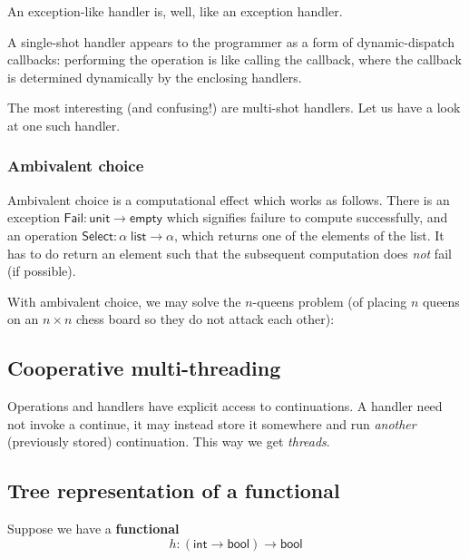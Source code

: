 \documentclass{article}
\begin{document}
An exception-like handler is, well, like an exception handler.

A single-shot handler appears to the programmer as a form of
dynamic-dispatch callbacks: performing the operation is like calling the
callback, where the callback is determined dynamically by the enclosing
handlers.

The most interesting (and confusing!) are multi-shot handlers. Let us
have a look at one such handler.

\hypertarget{ambivalent-choice}{%
\subsubsection{Ambivalent choice}\label{ambivalent-choice}}

Ambivalent choice is a computational effect which works as follows. There is an
exception $\mathsf{Fail} : \mathsf{unit} \to \mathsf{empty}$ which signifies
failure to compute successfully, and an operation
$\mathsf{Select} : \alpha\; \mathsf{list} \to \alpha$, which returns one of the
elements of the list. It has to do return an element such that the subsequent
computation does \emph{not} fail (if possible).

With ambivalent choice, we may solve the $n$-queens problem (of
placing $n$ queens on an $n \times n$ chess board so they do
not attack each other):



\hypertarget{cooperative-multi-threading}{%
\subsection{Cooperative
multi-threading}\label{cooperative-multi-threading}}

Operations and handlers have explicit access to continuations. A handler
need not invoke a continue, it may instead store it somewhere and run
\emph{another} (previously stored) continuation. This way we get
\emph{threads}.



\hypertarget{tree-representation-of-a-functional}{%
\subsection{Tree representation of a
functional}\label{tree-representation-of-a-functional}}

Suppose we have a \textbf{functional}
%
\begin{equation*}
  h : (\mathsf{int} \to \mathsf{bool}) \to \mathsf{bool}
\end{equation*}
\end{document}
